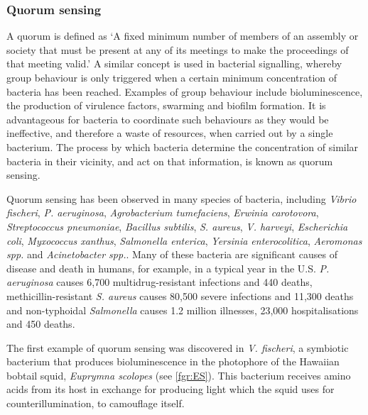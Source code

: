 \subsubsection{Quorum sensing\label{sec:QS}}

A quorum is defined as `A fixed minimum number of members of an assembly or society that must be present at any of its meetings to make the proceedings of that meeting valid.' \cite{Dictionary}  
A similar concept is used in bacterial signalling, whereby group behaviour is only triggered when a certain minimum concentration of bacteria has been reached. Examples of group behaviour include bioluminescence, the production of virulence factors, swarming and biofilm formation\cite{Miller2001}.  
It is advantageous for bacteria to coordinate such behaviours as they would be ineffective, and therefore a waste of resources, when carried out by a single bacterium.
The process by which bacteria determine the concentration of similar bacteria in their vicinity, and act on that information, is known as quorum sensing.

Quorum sensing has been observed in many species of bacteria, including \textit{Vibrio fischeri}, \textit{P. aeruginosa}, \textit{Agrobacterium tumefaciens}, \textit{Erwinia carotovora}, \textit{Streptococcus pneumoniae}, \textit{Bacillus subtilis}, \textit{S. aureus}, \textit{V. harveyi}, \textit{Escherichia coli}, \textit{Myxococcus xanthus}, \textit{Salmonella enterica}, \textit{Yersinia enterocolitica}, \textit{Aeromonas spp.} and \textit{Acinetobacter spp.}\cite{Miller2001,Fuqua1994,Waters2005,Atkinson2006,Chan2011,Sauer2002,Michael2001,Ahmer2004,Nealson1970,Visick2006}. 
Many of these bacteria are significant causes of disease and death in humans, for example, in a typical year in the U.S. \textit{P. aeruginosa} causes 6,700 multidrug-resistant infections and 440 deaths, methicillin-resistant \textit{S. aureus} causes 80,500 severe infections and 11,300 deaths and non-typhoidal \textit{Salmonella} causes 1.2 million illnesses, 23,000 hospitalisations and 450 deaths\cite{ResistanceUS}.


The first example of quorum sensing was discovered in \textit{V. fischeri}, a symbiotic bacterium that produces bioluminescence in the photophore of the Hawaiian bobtail squid, \textit{Euprymna scolopes} \cite{Nealson1970,Miller2001,Visick2006} (see \ref{fgr:ES}). This bacterium receives amino acids\cite{Graf1998, Lemus2000} from its host in exchange for producing light which the squid uses for counterillumination, to camouflage itself\cite{Jones2004}. 

